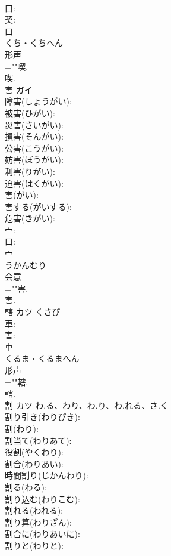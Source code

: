 \documentclass[8pt]{extreport}
\begin{document}
\begin{CJK}{UTF8}{min}
\\	口: 
\\	契: 
\\	口	
\\	くち・くちへん	
\\	形声 
\\	=""喫.
\\	喫.
\\	害	ガイ			
\\	障害(しょうがい): 
\\	被害(ひがい): 
\\	災害(さいがい): 
\\	損害(そんがい): 
\\	公害(こうがい): 
\\	妨害(ぼうがい): 
\\	利害(りがい): 
\\	迫害(はくがい): 
\\	害(がい): 
\\	害する(がいする): 
\\	危害(きがい): 
\\	宀: 
\\	口: 
\\	宀	
\\	うかんむり	
\\	会意 
\\	=""害.
\\	害.
\\	轄	カツ	くさび		
\\	車: 
\\	害: 
\\	車	
\\	くるま・くるまへん	
\\	形声 
\\	=""轄.
\\	轄.
\\	割	カツ	わ.る、わり、わ.り、わ.れる、さ.く		
\\	割り引き(わりびき): 
\\	割(わり): 
\\	割当て(わりあて): 
\\	役割(やくわり): 
\\	割合(わりあい): 
\\	時間割り(じかんわり): 
\\	割る(わる): 
\\	割り込む(わりこむ): 
\\	割れる(われる): 
\\	割り算(わりざん): 
\\	割合に(わりあいに): 
\\	割りと(わりと): 

\end{CJK}
\end{document}
